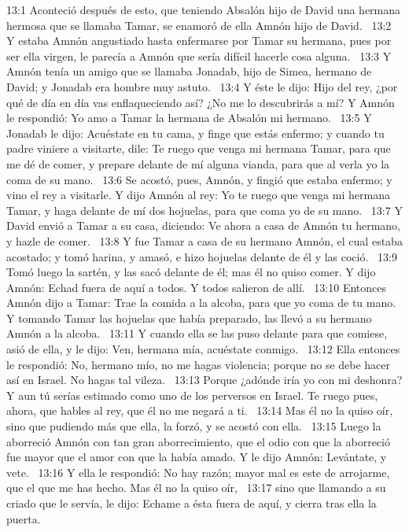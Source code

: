 13:1 Aconteció después de esto, que teniendo Absalón hijo de David una hermana hermosa que se llamaba Tamar, se enamoró de ella Amnón hijo de David.  
13:2 Y estaba Amnón angustiado hasta enfermarse por Tamar su hermana, pues por ser ella virgen, le parecía a Amnón que sería difícil hacerle cosa alguna.  
13:3 Y Amnón tenía un amigo que se llamaba Jonadab, hijo de Simea, hermano de David; y Jonadab era hombre muy astuto.  
13:4 Y éste le dijo: Hijo del rey, ¿por qué de día en día vas enflaqueciendo así? ¿No me lo descubrirás a mí? Y Amnón le respondió: Yo amo a Tamar la hermana de Absalón mi hermano.  
13:5 Y Jonadab le dijo: Acuéstate en tu cama, y finge que estás enfermo; y cuando tu padre viniere a visitarte, dile: Te ruego que venga mi hermana Tamar, para que me dé de comer, y prepare delante de mí alguna vianda, para que al verla yo la coma de su mano.  
13:6 Se acostó, pues, Amnón, y fingió que estaba enfermo; y vino el rey a visitarle. Y dijo Amnón al rey: Yo te ruego que venga mi hermana Tamar, y haga delante de mí dos hojuelas, para que coma yo de su mano.  
13:7 Y David envió a Tamar a su casa, diciendo: Ve ahora a casa de Amnón tu hermano, y hazle de comer.  
13:8 Y fue Tamar a casa de su hermano Amnón, el cual estaba acostado; y tomó harina, y amasó, e hizo hojuelas delante de él y las coció.  
13:9 Tomó luego la sartén, y las sacó delante de él; mas él no quiso comer. Y dijo Amnón: Echad fuera de aquí a todos. Y todos salieron de allí.  
13:10 Entonces Amnón dijo a Tamar: Trae la comida a la alcoba, para que yo coma de tu mano. Y tomando Tamar las hojuelas que había preparado, las llevó a su hermano Amnón a la alcoba.  
13:11 Y cuando ella se las puso delante para que comiese, asió de ella, y le dijo: Ven, hermana mía, acuéstate conmigo.  
13:12 Ella entonces le respondió: No, hermano mío, no me hagas violencia; porque no se debe hacer así en Israel. No hagas tal vileza.  
13:13 Porque ¿adónde iría yo con mi deshonra? Y aun tú serías estimado como uno de los perversos en Israel. Te ruego pues, ahora, que hables al rey, que él no me negará a ti.  
13:14 Mas él no la quiso oír, sino que pudiendo más que ella, la forzó, y se acostó con ella.  
13:15 Luego la aborreció Amnón con tan gran aborrecimiento, que el odio con que la aborreció fue mayor que el amor con que la había amado. Y le dijo Amnón: Levántate, y vete.  
13:16 Y ella le respondió: No hay razón; mayor mal es este de arrojarme, que el que me has hecho. Mas él no la quiso oír,  
13:17 sino que llamando a su criado que le servía, le dijo: Echame a ésta fuera de aquí, y cierra tras ella la puerta.  
